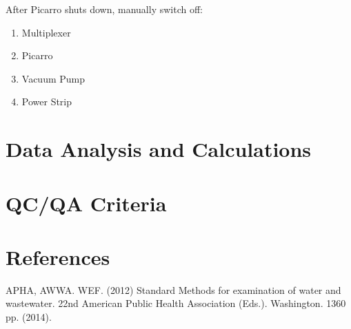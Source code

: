 \documentclass[12pt]{../SOP3_alpha}
\begin{document}
                               \NP After Picarro shuts down, manually switch off:
                                 \begin{enumerate}
                               \item Multiplexer
                               \item Picarro
                               \item Vacuum Pump
                               \item Power Strip
                               \end{enumerate}
                               


\section{Data Analysis and Calculations}

\section{QC/QA Criteria}

\section{References}

\NP APHA, AWWA. WEF. (2012) Standard Methods for examination of water and wastewater. 22nd American Public Health Association (Eds.). Washington. 1360 pp. (2014).
\end{document}
